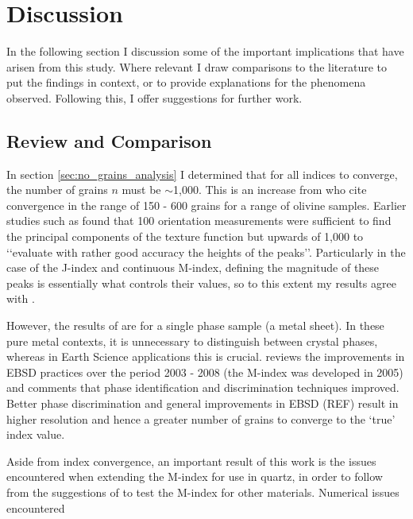 \documentclass[a4paper,12pt,twoside]{report}
\numberwithin{equation}{chapter}
\begin{document}
\chapter{Discussion} \label{chap:discussion}
\vspace{-1cm}
In the following section I discussion some of the important implications that have arisen from this study. Where relevant I draw comparisons to the literature to put the findings in context, or to provide explanations for the phenomena observed. Following this, I offer suggestions for further work.


\section{Review and Comparison} \label{sec:diss_results_comp}

In section \ref{sec:no_grains_analysis} I determined that for all indices to converge, the number of grains $n$ must be $\sim$1,000. This is an increase from \cite{Skemer} who cite convergence in the range of 150 - 600 grains for a range of olivine samples. Earlier studies such as \cite{Baudin1993} found that 100 orientation measurements were sufficient to find the principal components of the texture function but upwards of 1,000 to \lq\lq{}evaluate with rather good accuracy the heights of the peaks\rq\rq{}. Particularly in the case of the J-index and continuous M-index, defining the magnitude of these peaks is essentially what controls their values, so to this extent my results agree with \cite{Baudin1993}. 

However, the results of \cite{Baudin1993} are for a single phase sample (a metal sheet). In these pure metal contexts, it is unnecessary to distinguish between crystal phases, whereas in Earth Science applications this is crucial. \cite{Randle2009} reviews the improvements in EBSD practices over the period 2003 - 2008 (the M-index was developed in 2005) and comments that phase identification and discrimination techniques improved. Better phase discrimination and general improvements in EBSD (REF) result in higher resolution and hence a greater number of grains to converge to the \lq{}true\rq{} index value. 

Aside from index convergence, an important result of this work is the issues encountered when extending the M-index for use in quartz, in order to follow from the suggestions of \cite{Skemer} to test the M-index for other materials. Numerical issues encountered
\end{document}
